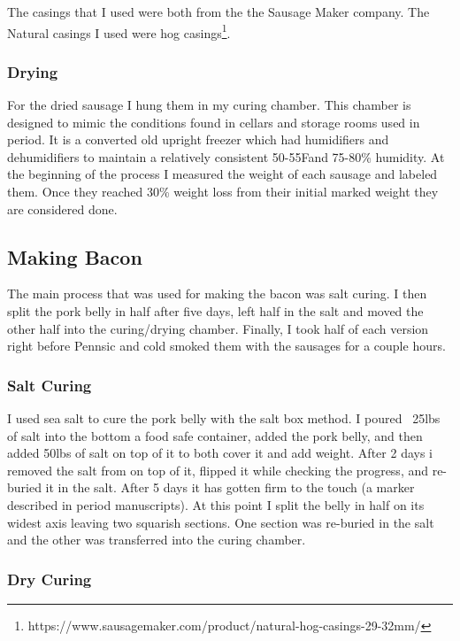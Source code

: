 \documentclass[letterpaper,11pt,leqno]{article}
\begin{document}
The casings that I used were both from the the Sausage Maker company. The Natural casings I used were hog casings\footnote{https://www.sausagemaker.com/product/natural-hog-casings-29-32mm/}.

\subsubsection{Drying}

For the dried sausage I hung them in my curing chamber. This chamber is designed to mimic the conditions found in cellars and storage rooms used in period. It is a converted old upright freezer which had humidifiers and dehumidifiers to maintain a relatively consistent 50-55F\textdegree and 75-80\% humidity. At the beginning of the process I measured the weight of each sausage and labeled them. Once they reached 30\% weight loss from their initial marked weight they are considered done.

\FloatBarrier

\subsection{Making Bacon}

The main process that was used for making the bacon was salt curing. I then split the pork belly in half after five days, left half in the salt and moved the other half into the curing/drying chamber. Finally, I took half of each version right before Pennsic and cold smoked them with the sausages for a couple hours.

\subsubsection{Salt Curing}
I used sea salt to cure the pork belly with the salt box method. I poured ~25lbs of salt into the bottom a food safe container, added the pork belly, and then added 50lbs of salt on top of it to both cover it and add weight. After 2 days i removed the salt from on top of it, flipped it while checking the progress, and re-buried it in the salt. After 5 days it has gotten firm to the touch (a marker described in period manuscripts). At this point I split the belly in half on its widest axis leaving two squarish sections. One section was re-buried in the salt and the other was transferred into the curing chamber.

\subsubsection{Dry Curing}
\end{document}
